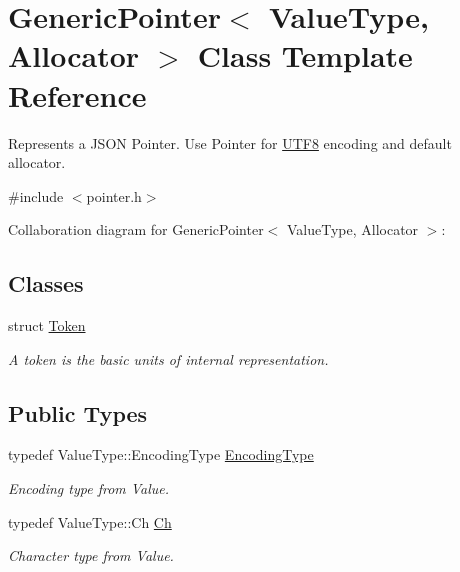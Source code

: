 \hypertarget{class_generic_pointer}{}\section{Generic\+Pointer$<$ Value\+Type, Allocator $>$ Class Template Reference}
\label{class_generic_pointer}


Represents a J\+S\+ON Pointer. Use Pointer for \hyperlink{struct_u_t_f8}{U\+T\+F8} encoding and default allocator.  




{\ttfamily \#include $<$pointer.\+h$>$}



Collaboration diagram for Generic\+Pointer$<$ Value\+Type, Allocator $>$\+:
\subsection*{Classes}
\begin{DoxyCompactItemize}
\item 
struct \hyperlink{struct_generic_pointer_1_1_token}{Token}
\begin{DoxyCompactList}\small\item\em A token is the basic units of internal representation. \end{DoxyCompactList}\end{DoxyCompactItemize}
\subsection*{Public Types}
\begin{DoxyCompactItemize}
\item 
\mbox{\label{class_generic_pointer_a4b802da797a7a0b615fd9611cedb7c3b}} 
typedef Value\+Type\+::\+Encoding\+Type \hyperlink{class_generic_pointer_a4b802da797a7a0b615fd9611cedb7c3b}{Encoding\+Type}
\begin{DoxyCompactList}\small\item\em Encoding type from Value. \end{DoxyCompactList}\item 
\mbox{\label{class_generic_pointer_ab292356c11b4015c98d21b966b11f285}} 
typedef Value\+Type\+::\+Ch \hyperlink{class_generic_pointer_ab292356c11b4015c98d21b966b11f285}{Ch}
\begin{DoxyCompactList}\small\item\em Character type from Value. \end{DoxyCompactList}\end{DoxyCompactItemize}
